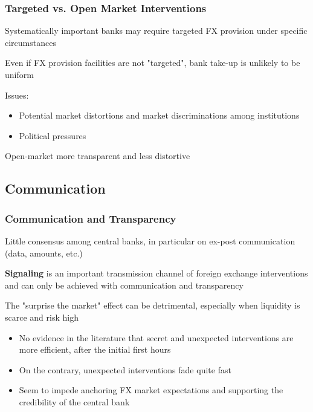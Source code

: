\documentclass{beamer}
\newenvironment{wideitemize}{\itemize\addtolength{\itemsep}{10pt}}{\enditemize}
\begin{document}
\begin{frame}
  \frametitle{Targeted vs. Open Market Interventions}
  \begin{wideitemize}
    \item Systematically important banks may require targeted FX provision under specific circumstances
    \item Even if FX provision facilities are not "targeted", bank take-up is unlikely to be uniform
    \item Issues:
      \begin{itemize}
      \item Potential market distortions and market discriminations among institutions
      \item Political pressures
      \end{itemize}
  \item Open-market more transparent and less distortive
  \end{wideitemize}
\end{frame}


\subsection{Communication}
\begin{frame}
  \frametitle{Communication and Transparency}
  \begin{wideitemize}
  \item Little consensus among central banks, in particular on ex-post communication (data, amounts, etc.)
  \item \textbf{Signaling} is an important transmission channel of foreign exchange interventions and can only be achieved with communication and transparency
  \item The "surprise the market" effect can be detrimental, especially when liquidity is scarce and risk high
    \begin{itemize}
    \item No evidence in the literature that secret and unexpected interventions are more efficient, after the initial first hours
    \item On the contrary, unexpected interventions fade quite fast
    \item Seem to impede anchoring FX market expectations and supporting the credibility of the central bank
    \end{itemize}    
  \end{wideitemize}
\end{frame}
\end{document}
